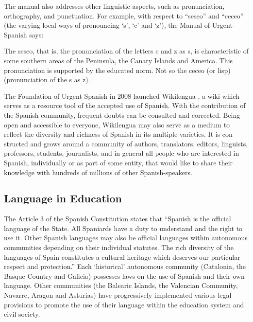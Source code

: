 \begin{multicols}{2}
The manual also addresses other linguistic aspects, such as pronunciation, orthography, and punctuation. For example, with respect to “seseo” and “ceceo” (the varying local ways of pronouncing ‘s’, ‘c’ and ‘z’), the Manual of Urgent Spanish says:

The seseo, that is, the pronunciation of the letters c and z as s, is characteristic of some southern areas of the Peninsula, the Canary Islands and America. This pronunciation is supported by the educated norm. Not so the ceceo (or lisp) (pronunciation of the s as z).

The Foundation of Urgent Spanish in 2008 launched Wikilengua \cite{wikilengua}, a wiki which serves as a resource tool of the accepted use of Spanish. With the contribution of the Spanish community, frequent doubts can be consulted and corrected. Being open and accessible to everyone, Wikilengua may also serve as a medium to reflect the diversity and richness of Spanish in its multiple varieties. It is con-structed and grows around a community of authors, translators, editors, linguists, professors, students, journalists, and in general all people who are interested in Spanish, individually or as part of some entity, that would like to share their knowledge with hundreds of millions of other Spanish-speakers.

\subsection{Language in Education}

The Article 3 of the Spanish Constitution states that “Spanish is the official language of the State. All Spaniards have a duty to understand and the right to use it. Other Spanish languages may also be official languages within autonomous communities depending on their individual statutes. The rich diversity of the languages of Spain constitutes a cultural heritage which deserves our particular respect and protection.” Each ‘historical’ autonomous community (Catalonia, the Basque Country and Galicia) possesses laws on the use of Spanish and their own language. Other communities (the Balearic Islands, the Valencian Community, Navarre, Aragon and Asturias) have progressively implemented various legal provisions to promote the use of their language within the education system and civil society.



\end{multicols}
